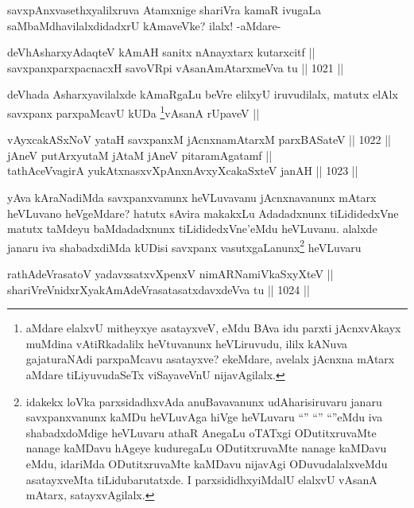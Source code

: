 \begin{artha}
savxpAnxvasethxyalilxruva Atamxnige shariVra kamaR ivugaLa saMbaMdhavilalxdidadxrU kAmaveVke? ilalx! -aMdare-
\end{artha}

\begin{shl}
deVhAsharxyAdaqteV kAmAH sanitx nAnayxtarx kutarxcitf || \\
savxpanxparxpacnacxH savoVR\s pi vAsanAmAtarxmeVva tu ||  1021 ||  
\end{shl}

\begin{artha}
deVhada Asharxyavilalxde kAmaRgaLu beVre elilxyU iruvudilalx, matutx elAlx savxpanx parxpaMcavU kUDa \footnote{aMdare elalxvU mitheyxye asatayxveV, eMdu BAva idu parxti jAcnxvAkayx muMdina vAtiRkadalilx heVtuvanunx heVLiruvudu, ililx kANuva gajaturaNAdi parxpaMcavu asatayxve? ekeMdare, avelalx jAcnxna mAtarx aMdare tiLiyuvudaSeTx viSayaveVnU nijavAgilalx.}vAsanA rUpaveV ||
\end{artha}


\begin{shl}
vAyxcakASxNoV yataH savxpanxM jAcnxnamAtarxM parxBASateV ||  1022 || \\
jAneV putArxyutaM jAtaM jAneV pitaramAgatamf || \\
tathAceVvagirA yukAtxnasxvXpAnxnAvxyXcakaSxteV janAH ||  1023 ||  
\end{shl}

\begin{artha}
yAva kAraNadiMda savxpanxvanunx heVLuvavanu jAcnxnavanunx mAtarx heVLuvano heVgeMdare? hatutx sAvira makakxLu Adadadxnunx tiLididedxVne matutx taMdeyu baMdadadxnunx tiLididedxVne'eMdu heVLuvanu. alalxde janaru iva shabadxdiMda kUDisi savxpanx vasutxgaLanunx\footnote{idakekx loVka parxsidadhxvAda anuBavavanunx udAharisiruvaru janaru savxpanxvanunx kaMDu heVLuvAga hiVge heVLuvaru ``\stext'' ``\stext'' ``\stext''eMdu iva shabadxdoMdige heVLuvaru athaR AnegaLu oTATxgi ODutitxruvaMte nanage kaMDavu hAgeye kuduregaLu ODutitxruvaMte nanage kaMDavu eMdu, idariMda ODutitxruvaMte kaMDavu nijavAgi ODuvudalalxveMdu asatayxveMta tiLidubarutatxde. I parxsididhxyiMdalU elalxvU vAsanA mAtarx, satayxvAgilalx.} heVLuvaru
\end{artha}

\begin{shl}
rathAdeVrasatoV yadavxsatxvXpenxV nimARNamiVkaSxyXteV || \\
shariVreVnidxrXyakAmAdeVrasatasatxdavxdeVva tu ||  1024 ||  
\end{shl}

